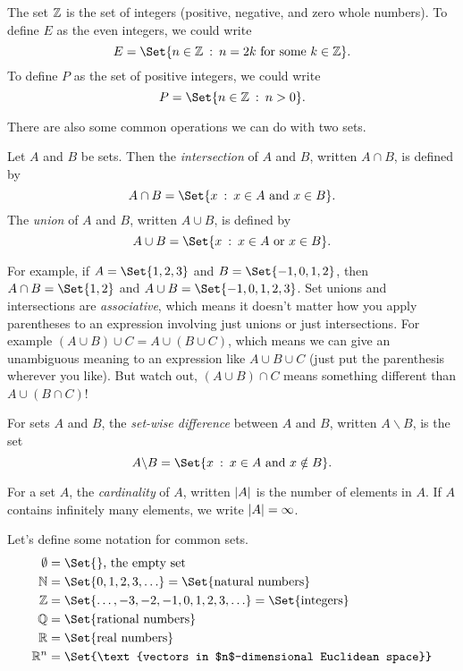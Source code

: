 	\begin{example}
		The set $\mathbb{Z}$ is the set of integers (positive, negative,
		and zero whole numbers).  To define $E$ as the even integers,
		we could write
		\[
			E=\Set{n\in \Z\given n=2k\text{ for some }k\in \Z}.
		\]
		To define $P$ as the set of positive integers, we could write
		\[
			P=\Set{n\in\Z\given n>0}.
		\]
	\end{example}


	There are also some common operations we can do with two sets.
	\begin{definition}
		Let $A$ and $B$ be sets. Then the \emph{intersection} of $A$ and $B$, written
		$A\cap B$, is defined by
		\[
			A\cap B=\Set{x\given x\in A\text{ and }x\in B}.
		\]
		The \emph{union} of $A$ and $B$, written $A\cup B$, is defined by
		\[
			A\cup B= \Set{x\given x\in A\text{ or } x\in B}.
		\]
	\end{definition}
	For example, if $A=\Set{1,2,3}$ and $B=\Set{-1,0,1,2}$, then $A\cap B=\Set{1,2}$ and $A\cup B=
	\Set{-1,0,1,2,3}$.  Set unions and intersections are \emph{associative}, which means it doesn't
	matter how you apply parentheses to an expression involving just unions or just intersections.
	For example $(A\cup B)\cup C=A\cup(B\cup C)$, which means
	we can give an unambiguous meaning to an expression like $A\cup B\cup C$ (just put
	the parenthesis wherever you like).  But watch out, $(A\cup B)\cap C$ means something
	different than $A\cup(B\cap C)$!

	\begin{definition}
		For sets $A$ and $B$, the \emph{set-wise difference} between $A$ and $B$,
		written $A\backslash B$, is the set
		\[
			A\backslash B = \Set{x\given x\in A\text{ and }x\notin B}.
		\]
	\end{definition}
	\begin{definition}[Cardinality]
		For a set $A$, the \emph{cardinality} of $A$,
		written $\lvert A\rvert$ is the number of elements in $A$.  If $A$
		contains infinitely many elements, we write $\lvert A\rvert=\infty$.
	\end{definition}

	Let's define some notation for common sets.
	\begin{align*}
		\emptyset &= \Set{}\text{, the empty set}\\
		\N &= \Set{0,1,2,3,\ldots}=\Set{\text{natural numbers}}\\
		\Z &= \Set{\ldots, -3,-2,-1,0,1,2,3,\ldots}=\Set{\text{integers}}\\
		\Q &= \Set{\text{rational numbers}}\\
		\R &= \Set{\text{real numbers}}\\
		\R^n &= \Set{\text{vectors in $n$-dimensional Euclidean space}}\\
	\end{align*}

